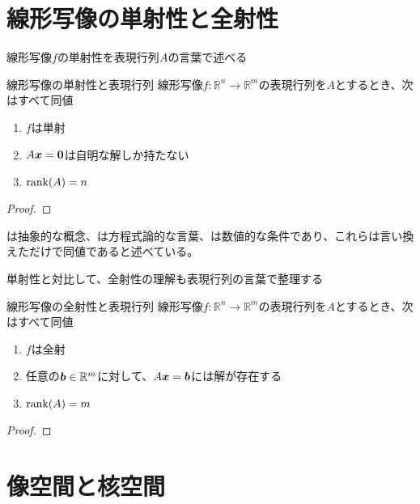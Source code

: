 \documentclass[../../../topic_linear-algebra]{subfiles}
\begin{document}
\sectionline
\section{線形写像の単射性と全射性}

線形写像$f$の単射性を表現行列$A$の言葉で述べる

\begin{theorem}{線形写像の単射性と表現行列}
  線形写像$f\colon \mathbb{R}^n \to \mathbb{R}^m$の表現行列を$A$とするとき、次はすべて同値
  \begin{enumerate}[label=\romanlabel]
    \item $f$は単射
    \item $A\vb*{x} = \vb*{0}$は自明な解しか持たない
    \item $\rank(A) = n$
  \end{enumerate}
\end{theorem}

\begin{proof}
\end{proof}

は抽象的な概念、は方程式論的な言葉、は数値的な条件であり、これらは言い換えただけで同値であると述べている。

\sectionline

単射性と対比して、全射性の理解も表現行列の言葉で整理する

\begin{theorem}{線形写像の全射性と表現行列}
  線形写像$f\colon \mathbb{R}^n \to \mathbb{R}^m$の表現行列を$A$とするとき、次はすべて同値
  \begin{enumerate}[label=\romanlabel]
    \item $f$は全射
    \item 任意の$\vb*{b} \in \mathbb{R}^m$に対して、$A\vb*{x} = \vb*{b}$には解が存在する
    \item $\rank(A) = m$
  \end{enumerate}
\end{theorem}

\begin{proof}
\end{proof}

\sectionline
\section{像空間と核空間}
\end{document}
